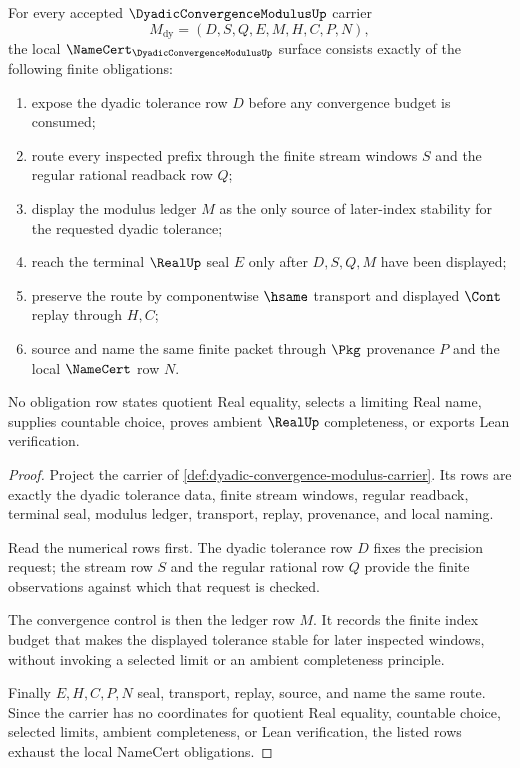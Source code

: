 \begin{theorem}
\label{thm:dyadic-convergence-modulus-namecert-obligations}
For every accepted $\DyadicConvergenceModulusUp$ carrier
$$
M_{\mathrm{dy}}=(D,S,Q,E,M,H,C,P,N),
$$
the local $\NameCert_{\DyadicConvergenceModulusUp}$ surface consists exactly of the following finite obligations:
\begin{enumerate}
\item expose the dyadic tolerance row $D$ before any convergence budget is consumed;
\item route every inspected prefix through the finite stream windows $S$ and the regular rational readback row $Q$;
\item display the modulus ledger $M$ as the only source of later-index stability for the requested dyadic tolerance;
\item reach the terminal $\RealUp$ seal $E$ only after $D,S,Q,M$ have been displayed;
\item preserve the route by componentwise $\hsame$ transport and displayed $\Cont$ replay through $H,C$;
\item source and name the same finite packet through $\Pkg$ provenance $P$ and the local $\NameCert$ row $N$.
\end{enumerate}
No obligation row states quotient Real equality, selects a limiting Real name, supplies countable choice, proves ambient $\RealUp$ completeness, or exports Lean verification.
\end{theorem}
\begin{proof}
Project the carrier of \autoref{def:dyadic-convergence-modulus-carrier}. Its rows are exactly the dyadic tolerance data, finite stream windows, regular readback, terminal seal, modulus ledger, transport, replay, provenance, and local naming.

Read the numerical rows first. The dyadic tolerance row $D$ fixes the precision request; the stream row $S$ and the regular rational row $Q$ provide the finite observations against which that request is checked.

The convergence control is then the ledger row $M$. It records the finite index budget that makes the displayed tolerance stable for later inspected windows, without invoking a selected limit or an ambient completeness principle.

Finally $E,H,C,P,N$ seal, transport, replay, source, and name the same route. Since the carrier has no coordinates for quotient Real equality, countable choice, selected limits, ambient completeness, or Lean verification, the listed rows exhaust the local NameCert obligations.
\end{proof}

